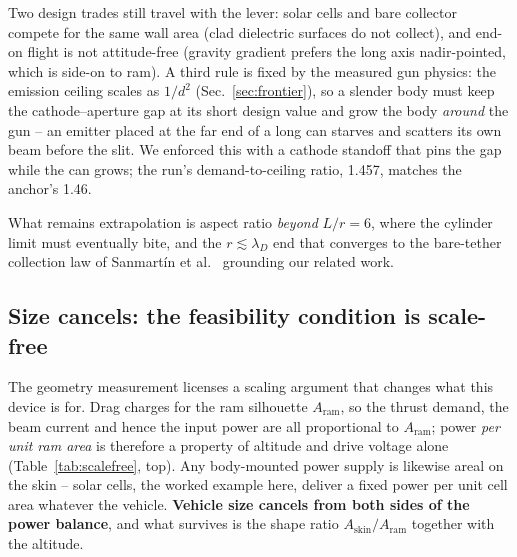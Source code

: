 \documentclass[11pt]{article}
\begin{document}
Two design trades still travel with the lever: solar cells and bare
collector compete for the same wall area (clad dielectric surfaces do not
collect), and end-on flight is not attitude-free (gravity gradient prefers
the long axis nadir-pointed, which is side-on to ram). A third rule is fixed
by the measured gun physics: the emission ceiling scales as $1/d^{2}$
(Sec.~\ref{sec:frontier}), so a slender body must keep the
cathode--aperture gap at its short design value and grow the body
\emph{around} the gun -- an emitter placed at the far end of a long can
starves and scatters its own beam before the slit. We enforced this with a
cathode standoff that pins the gap while the can grows; the run's
demand-to-ceiling ratio, 1.457, matches the anchor's 1.46.

What remains extrapolation is aspect ratio \emph{beyond} $L/r = 6$, where
the cylinder limit must eventually bite, and the $r \lesssim \lambda_D$ end
that converges to the bare-tether collection law of
Sanmart\'in et al.~\cite{san93} grounding our related work.

\subsection{Size cancels: the feasibility condition is scale-free}
\label{sec:scalefree}
The geometry measurement licenses a scaling argument that changes what this
device is for. Drag charges for the ram silhouette $A_{\mathrm{ram}}$, so the
thrust demand, the beam current and hence the input power are all
proportional to $A_{\mathrm{ram}}$; power \emph{per unit ram area} is
therefore a property of altitude and drive voltage alone
(Table~\ref{tab:scalefree}, top). Any body-mounted power supply is likewise
areal on the skin -- solar cells, the worked example here, deliver a fixed
power per unit cell area whatever the vehicle. \textbf{Vehicle size
cancels from both sides of the power balance}, and what survives is the shape
ratio $A_{\mathrm{skin}}/A_{\mathrm{ram}}$ together with the altitude.
\end{document}
